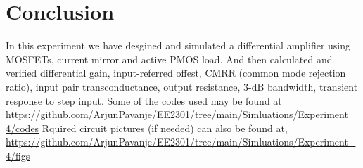 \documentclass[12pt,a4paper]{article}
\begin{document}
\section{Conclusion}
In this experiment we have desgined and simulated a differential amplifier using MOSFETs, current mirror and active PMOS load. And then calculated and verified differential gain, input-referred offest, CMRR (common mode rejection ratio), input pair transconductance, output resistance, 3-dB bandwidth, transient response to step input.\newline \newline 
Some of the codes used may be found at \url{https://github.com/ArjunPavanje/EE2301/tree/main/Simluations/Experiment_4/codes} \newline
Rquired circuit pictures (if needed) can also be found at, \url{https://github.com/ArjunPavanje/EE2301/tree/main/Simluations/Experiment_4/figs}
\end{document}

